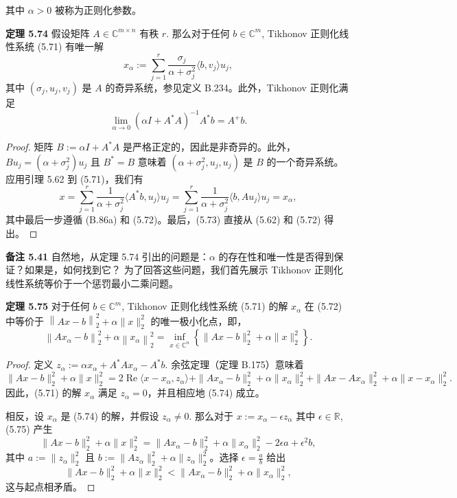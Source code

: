 \documentclass[a4paper]{ctexart}
\begin{document}
{其中 \(\alpha > 0\) 被称为正则化参数。

\noindent \textbf{定理 5.74 } 假设矩阵 \(A \in \mathbb{C}^{m \times n}\) 有秩 \(r\). 
那么对于任何 \(b \in \mathbb{C}^m\), Tikhonov 正则化线性系统 (5.71) 有唯一解
\[
  x_\alpha := \sum_{j=1}^r \frac{\sigma_j}{\alpha + \sigma_j^2} \langle b, v_j \rangle u_j, \tag{5.72}
\]
其中 \((\sigma_j, u_j, v_j)\) 是 \(A\) 的奇异系统，参见定义 B.234。此外，Tikhonov 正则化满足
\[
  \lim_{\alpha \to 0} (\alpha I + A^*A)^{-1}A^*b = A^+b. \tag{5.73}
\]

\begin{proof}
矩阵 \(B := \alpha I + A^*A\) 是严格正定的，因此是非奇异的。此外，\(Bu_j = (\alpha + \sigma_j^2)u_j\) 且 \(B^* = B\) 
意味着 \((\alpha + \sigma_j^2, u_j, u_j)\) 是 \(B\) 的一个奇异系统。应用引理 5.62 到 (5.71)，我们有
\[
  x = \sum_{j=1}^r \frac{1}{\alpha + \sigma_j^2} \langle A^*b, u_j \rangle u_j 
  = \sum_{j=1}^r \frac{1}{\alpha + \sigma_j^2} \langle b, Au_j \rangle u_j = x_\alpha,
\]
其中最后一步遵循 (B.86a) 和 (5.72)。最后，(5.73) 直接从 (5.62) 和 (5.72) 得出。    
\end{proof}

\noindent \textbf{备注 5.41} 自然地，从定理 5.74 引出的问题是：\(\alpha\) 的存在性和唯一性是否得到保证？如果是，如何找到它？
为了回答这些问题，我们首先展示 Tikhonov 正则化线性系统等价于一个惩罚最小二乘问题。

\noindent \textbf{定理 5.75 } 对于任何 \(b \in \mathbb{C}^m\), Tikhonov 正则化线性系统 (5.71) 的解 \(x_\alpha\) 在 (5.72) 
中等价于 \(\left\|A x - b\right\|_2^2 + \alpha \|x\|_2^2\) 的唯一极小化点，即，
\[
  \left\|A x_\alpha - b\right\|_2^2 + \alpha \left\|x_\alpha\right\|_2^2 = \inf_{x \in \mathbb{C}^n} \left\{\|A x - b\|_2^2 + \alpha \|x\|_2^2\right\}.
\]
\begin{proof}
定义 \(z_\alpha := \alpha x_\alpha + A^* A x_\alpha - A^* b\). 余弦定理（定理 B.175）意味着
\[
  \|A x - b\|_2^2 + \alpha \|x\|_2^2 
  = 2 \operatorname{Re} \langle x - x_\alpha, z_\alpha \rangle + \|A x_\alpha - b\|_2^2 
  + \alpha \|x_\alpha\|_2^2 + \|A x - A x_\alpha\|_2^2 + \alpha \|x - x_\alpha\|_2^2.
\]
因此，(5.71) 的解 \(x_\alpha\) 满足 \(z_\alpha = 0\)，并且相应地 (5.74) 成立。
  
相反，设 \(x_\alpha\) 是 (5.74) 的解，并假设 \(z_\alpha \neq 0\). 那么对于 \(x := x_\alpha - \epsilon z_\alpha\) 其中 \(\epsilon \in \mathbb{R}\), 
(5.75) 产生
\[
  \|A x - b\|_2^2 + \alpha \|x\|_2^2 = \|A x_\alpha - b\|_2^2 + \alpha \|x_\alpha\|_2^2 - 2 \epsilon a + \epsilon^2 b,
\]
其中 \(a := \|z_\alpha\|_2^2\) 且 \(b := \|A z_\alpha\|_2^2 + \alpha \|z_\alpha\|_2^2\)。选择 \(\epsilon = \frac{a}{b}\) 给出
\[
  \|A x - b\|_2^2 + \alpha \|x\|_2^2 < \|A x_\alpha - b\|_2^2 + \alpha \|x_\alpha\|_2^2,
\]
这与起点相矛盾。
\end{proof}

}
\end{document}
